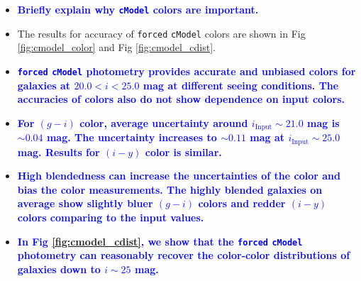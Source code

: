 \documentclass[useamsfonts]{pasj01}
\def\cmodel{\texttt{cModel}}
\def\forced{\texttt{forced}}
\newcommand{\plan}[1]{\textcolor{blue} {\textbf{#1}}}
\begin{document}
    \begin{itemize}

        \item \plan{Briefly explain why \cmodel{} colors are important.}

        \item The results for accuracy of \forced{} \cmodel{} colors are shown in
            Fig \ref{fig:cmodel_color} and Fig \ref{fig:cmodel_cdist}.

        \item \plan{\forced{} \cmodel{} photometry provides accurate and unbiased
            colors for galaxies at $20.0 < i < 25.0$ mag at different seeing conditions.
            The accuracies of colors also do not show dependence on input colors.
            }

        \item \plan{For $(g-i)$ color, average uncertainty around
            $i_{\mathrm{Input}}{\sim}21.0$ mag is ${\sim}0.04$ mag.
            The uncertainty increases to ${\sim}0.11$ mag at
            $i_{\mathrm{Input}}{\sim}25.0$ mag.
            Results for $(i-y)$ color is similar.}

        \item \plan{High blendedness can increase the uncertainties of the color
            and bias the color measurements.
            The highly blended galaxies on average show slightly bluer $(g-i)$ colors
            and redder $(i-y)$ colors comparing to the input values.}

        \item \plan{In Fig \ref{fig:cmodel_cdist}, we show that the \forced{} \cmodel{}
            photometry can reasonably recover the color-color distributions of galaxies
            down to $i{\sim}25$ mag.
            }

    \end{itemize}

\end{document}
